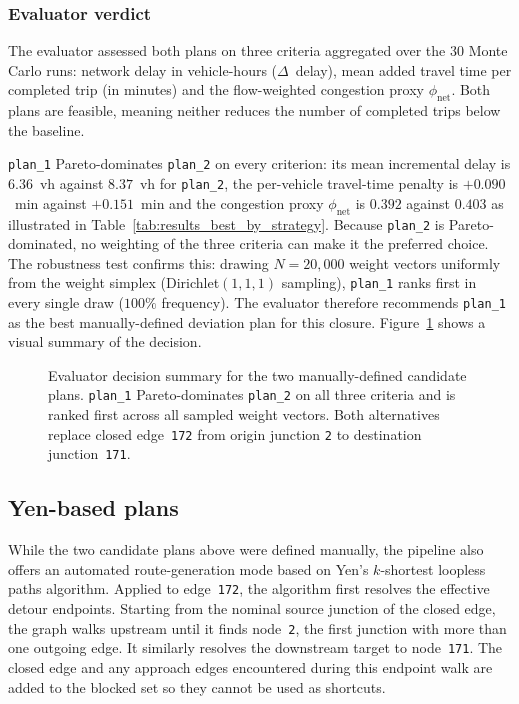 \subsubsection{Evaluator verdict}
The evaluator assessed both plans on three criteria aggregated over the 30
Monte Carlo runs: network delay in vehicle-hours ($\Delta$~delay), mean added
travel time per completed trip (in minutes) and the flow-weighted congestion
proxy $\phi_\text{net}$. Both plans are feasible, meaning neither reduces the
number of completed trips below the baseline.

\texttt{plan\_1} Pareto-dominates \texttt{plan\_2} on every criterion:
its mean incremental delay is $6.36$~vh against $8.37$~vh for
\texttt{plan\_2}, the per-vehicle travel-time penalty is $+0.090$~min
against $+0.151$~min and the congestion proxy $\phi_\text{net}$ is $0.392$
against $0.403$ as illustrated in Table~\ref{tab:results_best_by_strategy}.
Because \texttt{plan\_2} is Pareto-dominated, no weighting of the three criteria can make it the preferred choice.
The robustness test confirms this: drawing $N=20{,}000$ weight vectors
uniformly from the weight simplex (Dirichlet$(1,1,1)$ sampling),
\texttt{plan\_1} ranks first in every single draw ($100\%$ frequency).
The evaluator therefore recommends \texttt{plan\_1} as the
best manually-defined deviation plan for this closure.
Figure~\ref{fig:results_decision_summary} shows a visual
summary of the decision.

\begin{figure}[H]
  \centering
  \caption{Evaluator decision summary for the two manually-defined candidate
  plans. \texttt{plan\_1} Pareto-dominates \texttt{plan\_2} on all three
  criteria and is ranked first across all sampled weight vectors. Both
  alternatives replace closed edge~\texttt{172} from origin junction
  \texttt{2} to destination junction~\texttt{171}.}
  \label{fig:results_decision_summary}
\end{figure}

\subsection{Yen-based plans}

While the two candidate plans above were defined manually, the pipeline also
offers an automated route-generation mode based on Yen's $k$-shortest loopless
paths algorithm. Applied to edge~\texttt{172}, the algorithm first resolves
the effective detour endpoints. Starting from the nominal source junction of the closed edge, the graph walks
upstream until it finds node~\texttt{2}, the first junction with more than one
outgoing edge. It similarly resolves the downstream target to
node~\texttt{171}. The closed edge and any approach edges
encountered during this endpoint walk are added to the blocked set so they
cannot be used as shortcuts.

